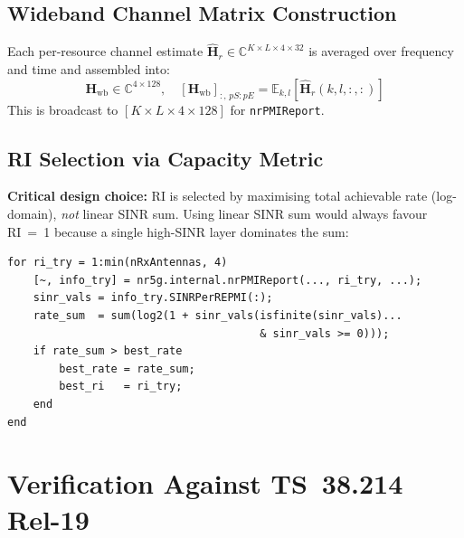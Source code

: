 \documentclass[11pt,a4paper]{article}
\begin{document}
\subsection{Wideband Channel Matrix Construction}

Each per-resource channel estimate
$\hat{\mathbf{H}}_r \in \mathbb{C}^{K \times L \times 4 \times 32}$
is averaged over frequency and time and assembled into:
\begin{equation}
  \mathbf{H}_\text{wb} \in \mathbb{C}^{4 \times 128}, \quad
  [\mathbf{H}_\text{wb}]_{:,\,pS:pE} =
    \mathbb{E}_{k,l}\left[\hat{\mathbf{H}}_r(k,l,:,:)\right]
\end{equation}
This is broadcast to $[K \times L \times 4 \times 128]$ for \texttt{nrPMIReport}.

\subsection{RI Selection via Capacity Metric}

\textbf{Critical design choice:} RI is selected by maximising total achievable rate
(log-domain), \emph{not} linear SINR sum. Using linear SINR sum would always
favour RI~=~1 because a single high-SINR layer dominates the sum:
\begin{lstlisting}
for ri_try = 1:min(nRxAntennas, 4)
    [~, info_try] = nr5g.internal.nrPMIReport(..., ri_try, ...);
    sinr_vals = info_try.SINRPerREPMI(:);
    rate_sum  = sum(log2(1 + sinr_vals(isfinite(sinr_vals)...
                                       & sinr_vals >= 0)));
    if rate_sum > best_rate
        best_rate = rate_sum;
        best_ri   = ri_try;
    end
end
\end{lstlisting}

\section{Verification Against TS~38.214 Rel-19}
\end{document}
